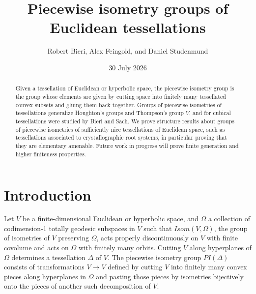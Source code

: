 \documentclass[11pt]{amsart}
\numberwithin{table}{section}
\numberwithin{figure}{section}
\theoremstyle{remark}
\begin{document}
\title{\bf{Piecewise isometry groups of Euclidean tessellations}}



\author{Robert Bieri, Alex Feingold, and Daniel Studenmund}

\date{30 July 2026}

\address{Department of Mathematics and Statistics, The State University of New York, Binghamton, New York 13902-6000}


\begin{abstract}
  Given a tessellation of Euclidean or hyperbolic space, the piecewise
  isometry group is the group whose elements are given by cutting
  space into finitely many tessellated convex subsets and gluing them
  back together. Groups of piecewise isometries of tessellations
  generalize Houghton's groups and Thompson's group $V$, and for
  cubical tessellations were studied by Bieri and Sach. We prove
  structure results about groups of piecewise isometries of
  sufficiently nice tessellations of Euclidean space, such as
  tessellations associated to crystallographic root systems, in
  particular proving that they are elementary amenable. Future work in
  progress will prove finite generation and higher finiteness
  properties.
\end{abstract}

\maketitle



\section{Introduction}\label{intro}

Let $V$ be a finite-dimensional Euclidean or hyperbolic space, and
$\Omega$ a collection of codimension-1 totally geodesic subspaces in
$V$ such that $Isom(V,\Omega)$, the group of isometries of $V$
preserving $\Omega$, acts properly discontinuously on $V$ with finite
covolume and acts on $\Omega$ with finitely many orbits. Cutting $V$
along hyperplanes of $\Omega$ determines a tessellation $\Delta$ of
$V$. The piecewise isometry group $PI(\Delta)$ consists of
transformations $V\to V$ defined by cutting $V$ into finitely many
convex pieces along hyperplanes in $\Omega$ and pasting those pieces
by isometries bijectively onto the pieces of another such
decomposition of $V$.
\end{document}
